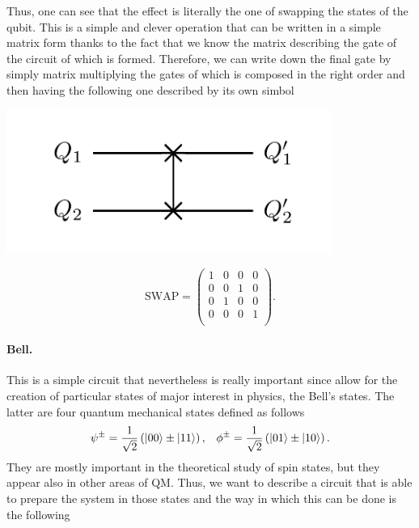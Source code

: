 \noindent
Thus, one can see that the effect is literally the one of swapping the states of the qubit. This is a simple and clever operation that can be written in a simple matrix form thanks to the fact that we know the matrix describing the gate of the circuit of which is formed. Therefore, we can write down the final gate by simply matrix multiplying the gates of which is composed in the right order and then having the following one described by its own simbol

\begin{minipage}{0.45\textwidth}
    \centering
    \includegraphics[width=0.8\textwidth]{Immagini/Swapsim.pdf}
\end{minipage}
\hspace{-1cm}
\begin{minipage}{0.45\textwidth}
    \begin{equation}
        \label{eq:swapMatrix}
        \text{SWAP} = \begin{pmatrix}
            1 & 0 & 0 & 0 \\
            0 & 0 & 1 & 0 \\
            0 & 1 & 0 & 0 \\
            0 & 0 & 0 & 1 \\
        \end{pmatrix}.
    \end{equation}
\end{minipage}

\paragraph{Bell.} This is a simple circuit that nevertheless is really important since allow for the creation of particular states of major interest in physics, the Bell's states. The latter are four quantum mechanical states defined as follows
\begin{align}
    &\psi^{\pm} = \frac{1}{\sqrt{2}}\left( \ket{00} \pm \ket{11} \right), &\phi^{\pm} = \frac{1}{\sqrt{2}}\left( \ket{01} \pm \ket{10} \right).
\end{align}
They are mostly important in the theoretical study of spin states, but they appear also in other areas of QM. Thus, we want to describe a circuit that is able to prepare the system in those states and the way in which this can be done is the following

